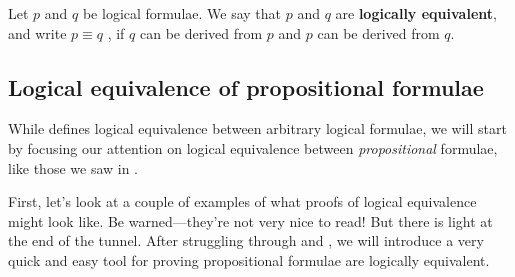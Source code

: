 \begin{definition}
\label{defLogicalEquivalence}
Let $p$ and $q$ be logical formulae. We say that $p$ and $q$ are \textbf{logically equivalent}, and write $p \equiv q$ , if $q$ can be derived from $p$ and $p$ can be derived from $q$.
\end{definition}

\subsection*{Logical equivalence of propositional formulae}

While  defines logical equivalence between arbitrary logical formulae, we will start by focusing our attention on logical equivalence between \textit{propositional} formulae, like those we saw in .

First, let's look at a couple of examples of what proofs of logical equivalence might look like. Be warned---they're not very nice to read! But there is light at the end of the tunnel. After struggling through  and , we will introduce a very quick and easy tool for proving propositional formulae are logically equivalent.

